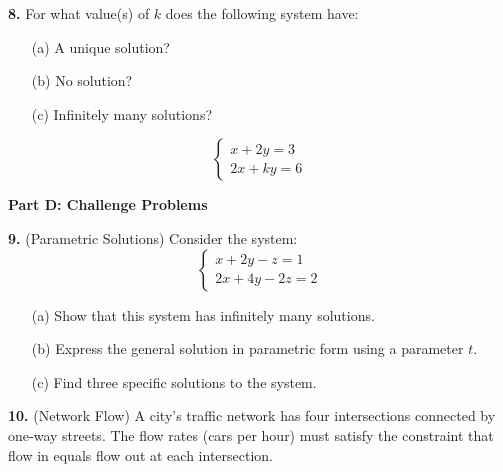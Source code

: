 \documentclass[12pt]{article}
\begin{document}
\textbf{8.} For what value(s) of $k$ does the following system have:
\begin{enumerate}
\item[(a)] A unique solution?
\item[(b)] No solution?
\item[(c)] Infinitely many solutions?
\end{enumerate}

$$\begin{cases}
x + 2y = 3 \\
2x + ky = 6
\end{cases}$$
\vspace{4cm}

\newpage

\textbf{Part D: Challenge Problems}

\textbf{9.} (Parametric Solutions) Consider the system:
$$\begin{cases}
x + 2y - z = 1 \\
2x + 4y - 2z = 2
\end{cases}$$

\begin{enumerate}
\item[(a)] Show that this system has infinitely many solutions.
\vspace{3cm}

\item[(b)] Express the general solution in parametric form using a parameter $t$.
\vspace{3cm}

\item[(c)] Find three specific solutions to the system.
\vspace{2cm}
\end{enumerate}

\textbf{10.} (Network Flow) A city's traffic network has four intersections connected by one-way streets. The flow rates (cars per hour) must satisfy the constraint that flow in equals flow out at each intersection.
\end{document}
